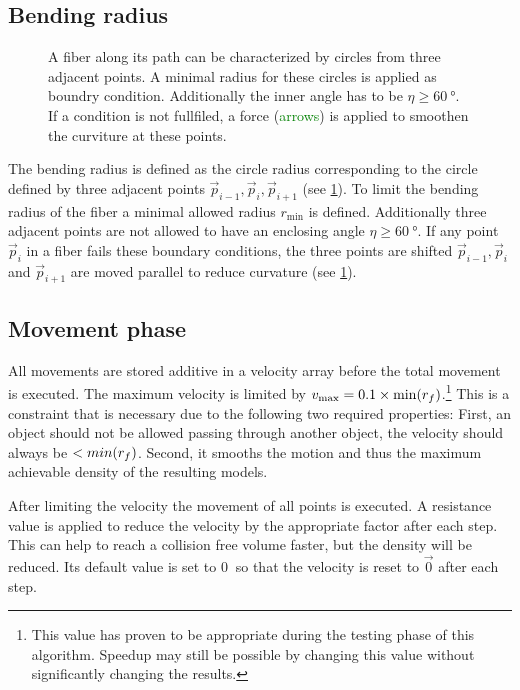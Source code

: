 \subsection{Bending radius}
%
\begin{figure}[!t]
    \centering
    \setlength{\tikzheight}{.75\textwidth}
	\caption{A fiber along its path can be characterized by circles from three adjacent points. A minimal radius for these circles is applied as boundry condition. Additionally the inner angle has to be $\eta \geq \SI{60}{\degree}$. If a condition is not fullfiled, a force (\textcolor{GREEN}{arrows}) is applied to smoothen the curviture at these points.}
	\label{fig:modelCircle}
\end{figure}
%
The bending radius is defined as the circle radius corresponding to the circle defined by three adjacent points $\vec{p}_{i-1}, \vec{p}_{i}, \vec{p}_{i+1}$ (see \cref{fig:modelCircle}).
To limit the bending radius of the fiber a minimal allowed radius $r_{\min}$ is defined.
Additionally three adjacent points are not allowed to have an enclosing angle $\eta \geq \SI{60}{\degree}$.
If any point $\vec{p}_{i}$ in a fiber fails these boundary conditions, the three points are shifted $\vec{p}_{i-1}, \vec{p}_{i}$ and $\vec{p}_{i+1}$ are moved parallel to reduce curvature (see \cref{fig:modelCircle}).
%
% 
% 
\subsection{Movement phase}
% 
All movements are stored additive in a velocity array before the total movement is executed.
The maximum velocity is limited by $v_{\max} = 0.1 \times \min(\mathit{\textnormal{$r_f$}})$.\footnote{This value has proven to be appropriate during the testing phase of this algorithm. Speedup may still be possible by changing this value without significantly changing the results.}
This is a constraint that is necessary due to the following two required properties:
First, an object should not be allowed passing through another object, \ie{} the velocity should always be $<min(\textnormal{$r_f$})$.
Second, it smooths the motion and thus the maximum achievable density of the resulting models.
\par
% 
After limiting the velocity the movement of all points is executed.
A resistance value is applied to reduce the velocity by the appropriate factor after each step.
This can help to reach a collision free volume faster, but the density will be reduced.
Its default value is set to $\SI{0}{}$ so that the velocity is reset to $\vec{0}$ after each step.
% 
% 
% 
